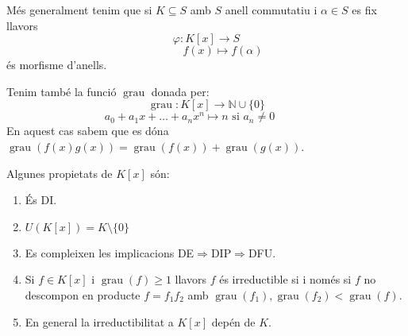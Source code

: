 \documentclass[a4paper,11pt]{report}
\DeclareMathOperator{\grau}{grau}
\newcommand{\im}{\Rightarrow}
\theoremstyle{theorem}
\theoremstyle{definition}
\begin{document}
Més generalment tenim que si $K\subseteq S$  amb $S$ anell commutatiu i $\alpha\in S$ es fix llavors $$\varphi:K[x]\longrightarrow S$$
$$\qquad\quad f(x)\longmapsto f(\alpha)$$ és morfisme d'anells.

Tenim també la funció $\grau$ donada per:
$$\grau:K[x]\longrightarrow \mathbb{N}\cup\{0\}$$
$$ a_0+a_1x+\ldots+a_nx^n\longmapsto n\text{ si }a_n\neq0\qquad\quad$$
En aquest cas sabem que es dóna $\grau(f(x)g(x))=\grau(f(x))+\grau(g(x))$.

Algunes propietats de $K[x]$ són:
\begin{enumerate}
	\item És DI.\item $U(K[x])=K\setminus\{0\}$
	\item Es compleixen les implicacions DE$\im$DIP$\im$DFU.
	\item Si $f\in K[x]$ i $\grau(f)\geq 1$ llavors $f$ és irreductible si i només si $f$ no descompon en producte $f=f_1f_2$ amb $\grau(f_1),\grau(f_2)<\grau(f)$.
	\item En general la irreductibilitat a $K[x]$ depén de $K$.
\end{enumerate}
\end{document}
